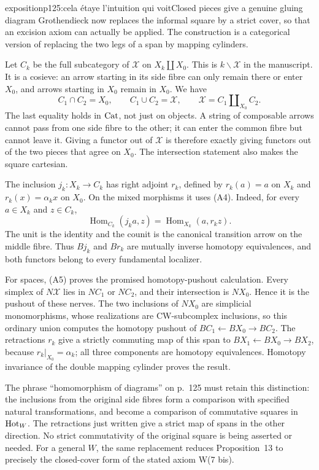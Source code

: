 \begin{dcomment}{exposition}{p125:cela étaye l'intuition qui voit}{Closed pieces give a genuine gluing diagram}
Grothendieck now replaces the informal square by a strict cover, so that an excision axiom can actually be applied.  The construction is a categorical version of replacing the two legs of a span by mapping cylinders.

Let $C_k$ be the full subcategory of $\mathcal X$ on $X_k\amalg X_0$.  This is $k\backslash\mathcal X$ in the manuscript.  It is a cosieve: an arrow starting in its side fibre can only remain there or enter $X_0$, and arrows starting in $X_0$ remain in $X_0$.  We have
\[
 C_1\cap C_2=X_0,\qquad C_1\cup C_2=\mathcal X,
 \qquad \mathcal X=C_1\amalg_{X_0}C_2.
 \tag{A5}
\]
The last equality holds in $\mathrm{Cat}$, not just on objects.  A string of composable arrows cannot pass from one side fibre to the other; it can enter the common fibre but cannot leave it.  Giving a functor out of $\mathcal X$ is therefore exactly giving functors out of the two pieces that agree on $X_0$.  The intersection statement also makes the square cartesian.

The inclusion $j_k:X_k\to C_k$ has right adjoint $r_k$, defined by $r_k(a)=a$ on $X_k$ and $r_k(x)=\alpha_kx$ on $X_0$.  On the mixed morphisms it uses (A4).  Indeed, for every $a\in X_k$ and $z\in C_k$,
\[
 \operatorname{Hom}_{C_k}(j_ka,z)
       =\operatorname{Hom}_{X_k}(a,r_kz).
\]
The unit is the identity and the counit is the canonical transition arrow on the middle fibre.  Thus $Bj_k$ and $Br_k$ are mutually inverse homotopy equivalences, and both functors belong to every fundamental localizer.

For spaces, (A5) proves the promised homotopy-pushout calculation.  Every simplex of $N\mathcal X$ lies in $NC_1$ or $NC_2$, and their intersection is $NX_0$.  Hence it is the pushout of these nerves.  The two inclusions of $NX_0$ are simplicial monomorphisms, whose realizations are CW-subcomplex inclusions, so this ordinary union computes the homotopy pushout of $BC_1\leftarrow BX_0\to BC_2$.  The retractions $r_k$ give a strictly commuting map of this span to $BX_1\leftarrow BX_0\to BX_2$, because $r_k|_{X_0}=\alpha_k$; all three components are homotopy equivalences.  Homotopy invariance of the double mapping cylinder proves the result.

The phrase ``homomorphism of diagrams'' on p.~125 must retain this distinction: the inclusions from the original side fibres form a comparison with specified natural transformations, and become a comparison of commutative squares in $\mathrm{Hot}_W$.  The retractions just written give a strict map of spans in the other direction.  No strict commutativity of the original square is being asserted or needed.  For a general $W$, the same replacement reduces Proposition~13 to precisely the closed-cover form of the stated axiom W(7 bis).
\end{dcomment}


